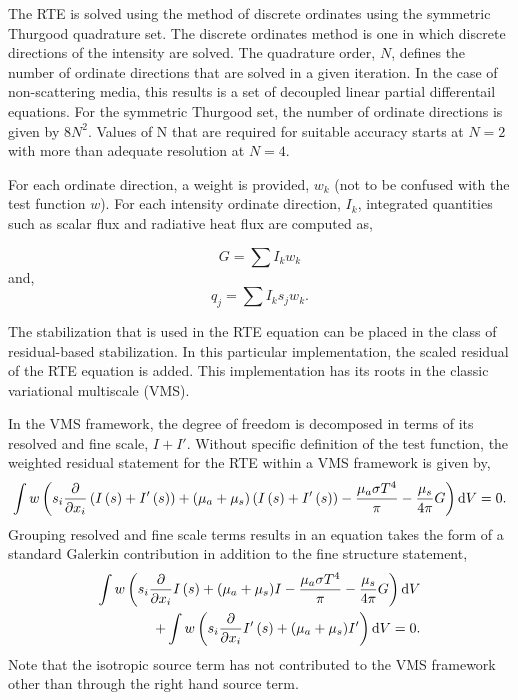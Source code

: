 The RTE is solved using the method of discrete ordinates using the symmetric
Thurgood quadrature set. The discrete ordinates method is one in which
discrete directions of the intensity are solved. The quadrature order, $N$,
defines the number of ordinate directions that are solved in a given 
iteration. In the case of non-scattering media, this results is a set
of decoupled linear partial differentail equations. For the symmetric
Thurgood set, the number of ordinate directions is given by $8N^2$. Values
of N that are required for suitable accuracy starts at $N=2$ with more than
adequate resolution at $N=4$.

For each ordinate direction, a weight is provided, $w_k$ (not to be confused with the
test function $w$). For each intensity ordinate direction,
$I_k$, integrated quantities such as scalar flux and radiative heat flux are computed as,

\begin{equation}
G = \sum I_k w_k
\end{equation}
and,
\begin{equation}
  q_j = \sum I_k s_j w_k.
\end{equation}

The stabilization that is used in the RTE equation can be placed in the
class of residual-based stabilization. In this particular implementation,
the scaled residual of the RTE equation is added. This implementation
has its roots in the classic variational multiscale (VMS). 

In the VMS framework, the degree of freedom is decomposed in terms of its 
resolved and fine scale, $I+I'$. Without specific definition of the test function, 
the weighted residual statement for the RTE within a VMS framework is given by,
\begin{equation}
   \int w \left( s_i {{\partial} \over {\partial x_i}} \left(I\left(s\right) + I'\left(s\right)\right)
   + (\mu_a + \mu_s) \left(I\left(s\right) + I'\left(s\right)\right) - {{\mu_a \sigma T^4} \over {\pi}} -\frac{\mu_s}{4\pi}G \right) {\rm d}V = 0.
\label{rteVMS}
\end{equation}
%
Grouping resolved and fine scale terms results in an equation takes the form of a standard Galerkin 
contribution in addition to the fine structure statement,
\begin{eqnarray}
   \int w \left( s_i {{\partial} \over {\partial x_i}} I\left(s\right)
   + (\mu_a + \mu_s)I - {{\mu_a \sigma T^4} \over {\pi}} -\frac{\mu_s}{4\pi}G \right) {\rm d}V  \nonumber \\ 
   + \int w \left( s_i {{\partial} \over {\partial x_i}} I'\left(s\right)
   + (\mu_a + \mu_s) I' \right) {\rm d}V  = 0.
\label{rteVMS1}
\end{eqnarray}
%
Note that the isotropic source term has not contributed to the VMS framework other than through
the right hand source term.

